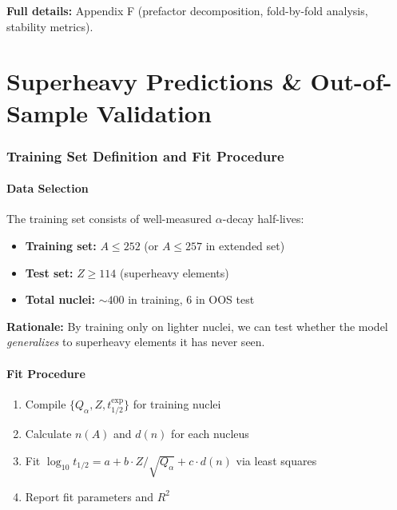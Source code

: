 \documentclass[11pt,a4paper]{article}
\begin{document}
\textbf{Full details:} Appendix F (prefactor decomposition, fold-by-fold analysis, stability metrics).

\newpage


\part{Superheavy Predictions \& Out-of-Sample Validation}

\section{Training Set Definition and Fit Procedure}
\label{sec:training}

\subsection{Data Selection}

The training set consists of well-measured $\alpha$-decay half-lives:

\begin{itemize}
    \item \textbf{Training set:} $A \leq 252$ (or $A \leq 257$ in extended set)
    \item \textbf{Test set:} $Z \geq 114$ (superheavy elements)
    \item \textbf{Total nuclei:} $\sim 400$ in training, 6 in OOS test
\end{itemize}

\textbf{Rationale:} By training only on lighter nuclei, we can test whether the model \emph{generalizes} to superheavy elements it has never seen.

\subsection{Fit Procedure}

\begin{enumerate}
    \item Compile $\{Q_\alpha, Z, t_{1/2}^{\text{exp}}\}$ for training nuclei
    \item Calculate $n(A)$ and $d(n)$ for each nucleus
    \item Fit $\log_{10} t_{1/2} = a + b \cdot Z/\sqrt{Q_\alpha} + c \cdot d(n)$ via least squares
    \item Report fit parameters and $R^2$
\end{enumerate}
\end{document}
